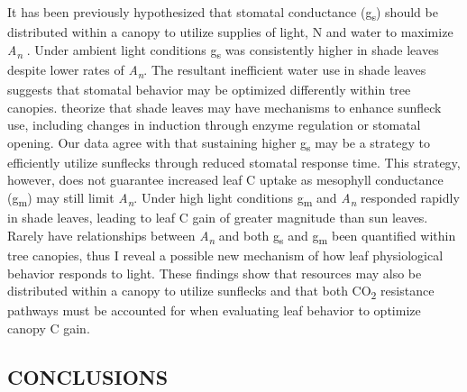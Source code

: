 \documentclass[a4paper]{article}\usepackage[]{graphicx}\usepackage[]{color}
\begin{document}
It has been previously hypothesized that stomatal conductance (g\textsubscript{s}) should be distributed within a canopy to utilize supplies of light, N and water to maximize \textit{A\textsubscript{n}} \citep{peltoniemi2012co}. Under ambient light conditions g\textsubscript{s} was consistently higher in shade leaves despite lower rates of \textit{A\textsubscript{n}}. The resultant inefficient water use in shade leaves suggests that stomatal behavior may be optimized differently within tree canopies. \citet{pearcy2012two} theorize that shade leaves may have mechanisms to enhance sunfleck use, including changes in induction through enzyme regulation or stomatal opening. Our data agree with \citet{tausz2005dynamic} that sustaining higher g\textsubscript{s} may be a strategy to efficiently utilize sunflecks through reduced stomatal response time. This strategy, however, does not guarantee increased leaf C uptake as mesophyll conductance (g\textsubscript{m}) may still limit \textit{A\textsubscript{n}}. Under high light conditions g\textsubscript{m} and \textit{A\textsubscript{n}} responded rapidly in shade leaves, leading to leaf C gain of greater magnitude than sun leaves. Rarely have relationships between \textit{A\textsubscript{n}} and both g\textsubscript{s} and g\textsubscript{m} been quantified within tree canopies, thus I reveal a possible new mechanism of how leaf physiological behavior responds to light. These findings show that resources may also be distributed within a canopy to utilize sunflecks and that both CO\textsubscript{2} resistance pathways must be accounted for when evaluating leaf behavior to optimize canopy C gain.

\subsection*{CONCLUSIONS}
\end{document}
